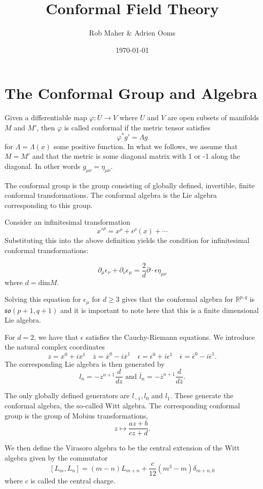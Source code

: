 \documentclass{article}
\title{Conformal Field Theory}
\author{Rob Maher \& Adrien Ooms}
\date{\today}
\newcommand{\R}{\mathbb{R}}
\begin{document}
\maketitle

\section{The Conformal Group and Algebra}

Given a differentiable map $\varphi: U \rightarrow V$ where $U$ and $V$ are open subsets of manifolds $M$ and $M'$, then $\varphi$ is called conformal if the metric tensor satisfies $$\varphi^*g'=\Lambda g$$ for $\Lambda=\Lambda(x)$ some positive function. In what we follows, we assume that $M=M'$ and that the metric is some diagonal matrix with 1 or -1 along the diagonal. In other words $g_{\mu\nu}=\eta_{\mu\nu}$.

The conformal group is the group consisting of globally defined, invertible, finite conformal transformations. The conformal algebra is the Lie algebra corresponding to this group. 

Consider an infinitesimal transformation $$x'^{\rho}=x^{\rho}+\epsilon^{\rho}(x)+\cdots$$ Substituting this into the above definition yields the condition for infinitesimal conformal transformations: 

$$\partial_{\mu}\epsilon_{\nu}+\partial_{\nu}\epsilon_{\mu}=\frac{2}{d}\partial \cdot \epsilon \eta_{\mu\nu}$$ where $d=\text{dim} M$.

Solving this equation for $\epsilon_{\mu}$ for $d \geq 3$ gives that the conformal algebra for $\R^{p,q}$ is $\mathfrak{so}(p+1,q+1)$ and it is important to note here that this is a finite dimensional Lie algebra.

For $d=2$, we have that $\epsilon$ satisfies the Cauchy-Riemann equations. We introduce the natural complex coordinates $$ z=x^0+ix^1 \quad \overline{z}=\overline{x}^0-i\overline{x}^1 \quad \epsilon=\epsilon^0+i\epsilon^1 \quad \overline{\epsilon}=\overline{\epsilon}^0-i\overline{\epsilon}^1.$$  The corresponding Lie algebra is then generated by $$l_n=-z^{n+1}\frac{d}{dz} \text{ and } \overline{l}_n=-\overline{z}^{n+1}\frac{d}{d\overline{z}}.$$

The only globally defined generators are $l_{-1},l_0$ and $l_1$. These generate the conformal algebra, the so-called Witt algebra. The corresponding conformal group is the group of M\:obius transformations, $$z \mapsto \frac{az+b}{cz+d}.$$ 

We then define the Virasoro algebra to be the central extension of the Witt algebra given by the commutator $$[L_m,L_n]=(m-n)L_{m+n}+\frac{c}{12}(m^3-m)\delta_{m+n,0}$$
where $c$ is called the central charge. 
\end{document}
